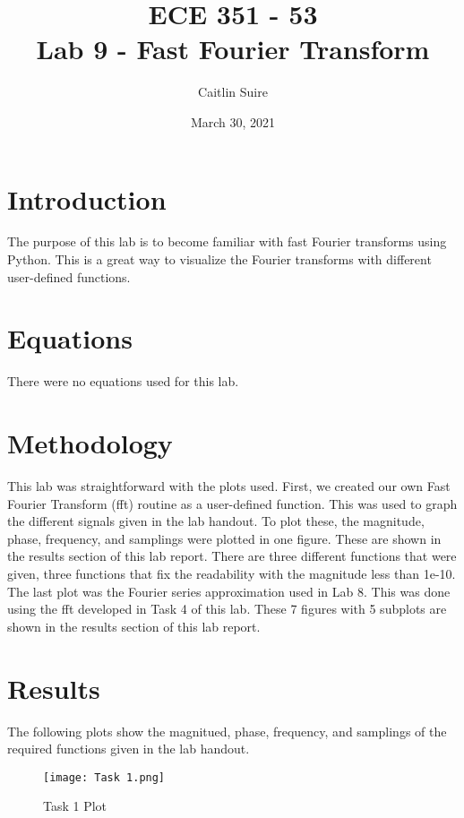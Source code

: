 \documentclass[12pt]{report}
\title{\myfont \textbf{ ECE 351 - 53 \\ \bigskip Lab 9 - Fast Fourier Transform}}
\author{Caitlin Suire}
\date{March 30, 2021}
\begin{document}
\maketitle

\thispagestyle{empty}

\newpage

\tableofcontents
\pagebreak


\section{Introduction}
The purpose of this lab is to become familiar with fast Fourier transforms using Python. This is a great way to visualize the Fourier transforms with different user-defined functions. 

\section{Equations}
There were no equations used for this lab. 

\section{Methodology}
This lab was straightforward with the plots used. First, we created our own Fast Fourier Transform (fft) routine as a user-defined function. This was used to graph the different signals given in the lab handout. To plot these, the magnitude, phase, frequency, and samplings were plotted in one figure. These are shown in the results section of this lab report. There are three different functions that were given, three functions that fix the readability with the magnitude less than 1e-10. The last plot was the Fourier series approximation used in Lab 8. This was done using the fft developed in Task 4 of this lab. These 7 figures with 5 subplots are shown in the results section of this lab report. 

\section{Results}
The following plots show the magnitued, phase, frequency, and samplings of the required functions given in the lab handout. 
\clearpage

\begin{figure}[ht]
\begin{center}
\texttt{[image: Task 1.png]}
\caption{Task 1 Plot}
\end{center}
\end{figure}
\end{document}
